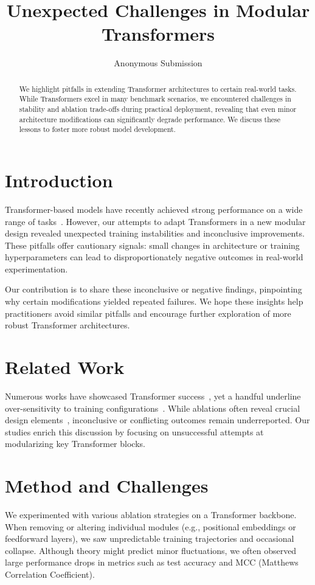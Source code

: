 \documentclass{article}
\begin{document}
\title{Unexpected Challenges in Modular Transformers}
\author{Anonymous Submission}
\date{}

\maketitle

\begin{abstract}
We highlight pitfalls in extending Transformer architectures to certain real-world tasks. While Transformers excel in many benchmark scenarios, we encountered challenges in stability and ablation trade-offs during practical deployment, revealing that even minor architecture modifications can significantly degrade performance. We discuss these lessons to foster more robust model development.
\end{abstract}

\section{Introduction}
Transformer-based models have recently achieved strong performance on a wide range of tasks~\cite{vaswani2017attention,he2016deep}. However, our attempts to adapt Transformers in a new modular design revealed unexpected training instabilities and inconclusive improvements. These pitfalls offer cautionary signals: small changes in architecture or training hyperparameters can lead to disproportionately negative outcomes in real-world experimentation.

Our contribution is to share these inconclusive or negative findings, pinpointing why certain modifications yielded repeated failures. We hope these insights help practitioners avoid similar pitfalls and encourage further exploration of more robust Transformer architectures.

\section{Related Work}
Numerous works have showcased Transformer success~\cite{krizhevsky2012imagenet,he2016deep}, yet a handful underline over-sensitivity to training configurations~\cite{goodfellow2014explaining}. While ablations often reveal crucial design elements~\cite{vaswani2017attention}, inconclusive or conflicting outcomes remain underreported. Our studies enrich this discussion by focusing on unsuccessful attempts at modularizing key Transformer blocks.

\section{Method and Challenges}
We experimented with various ablation strategies on a Transformer backbone. When removing or altering individual modules (e.g., positional embeddings or feedforward layers), we saw unpredictable training trajectories and occasional collapse. Although theory might predict minor fluctuations, we often observed large performance drops in metrics such as test accuracy and MCC (Matthews Correlation Coefficient).
\end{document}
